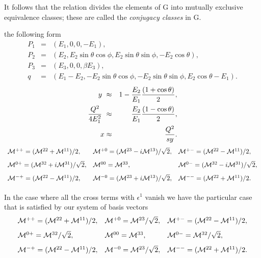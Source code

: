 \documentclass[epsf]{article}
\begin{document}
It follows that the relation divides the elements of G into mutually
exclusive equivalence classes; these are called the {\it conjugacy classes}
in G. 

the following form
  \begin{eqnarray*}
   P_1 & = & (E_1,0,0,-E_1),      \\
   P_2 & = & (E_2,E_2\sin\theta\cos\phi,E_2\sin\theta\sin\phi,
               -E_2\cos\theta),   \\
   P_3 & = & (E_3,0,0,\beta E_3),      \\
   q   & = & (E_1 - E_2,-E_2\sin\theta\cos\phi,-E_2\sin\theta\sin\phi,
                    E_2\cos\theta - E_1).
  \end{eqnarray*}
  \begin{eqnarray*}
    y\     & \approx & 1 - {E_2\over E_1} {(1+\cos\theta)\over2}, \\
    {Q^2\over4E_1^2} \ & \approx & {E_2\over E_1}{(1-\cos\theta)\over2}, \\
    x      & \approx & {Q^2\over sy}.
  \end{eqnarray*}
\[ \begin{array}{lll} 
  {\cal M}^{++}=({\cal M}^{22} + {\cal M}^{11})/2, 
& {\cal M}^{+0}=({\cal M}^{23} -i{\cal M}^{13})/\sqrt{2},
& {\cal M}^{+-}=({\cal M}^{22} - {\cal M}^{11})/2, \\ [8pt]
  {\cal M}^{0+}=({\cal M}^{32} +i{\cal M}^{31})/\sqrt{2}, 
& {\cal M}^{00}= {\cal M}^{33}, 
& {\cal M}^{0-}=({\cal M}^{32} -i{\cal M}^{31})/\sqrt{2}, \\ [8pt]
  {\cal M}^{-+}=({\cal M}^{22} - {\cal M}^{11})/2, 
& {\cal M}^{-0}=({\cal M}^{23} +i{\cal M}^{13})/\sqrt{2}, 
& {\cal M}^{--}=({\cal M}^{22} + {\cal M}^{11})/2. \\ [8pt]
\end{array} \] In the case where all the cross terms with $\epsilon^1$
vanish we have the particular case that is satisfied by our system of 
basis vectors
\[ \begin{array}{lll} 
  {\cal M}^{++}=({\cal M}^{22} + {\cal M}^{11})/2, 
& {\cal M}^{+0}= {\cal M}^{23}/\sqrt{2},
& {\cal M}^{+-}=({\cal M}^{22} - {\cal M}^{11})/2, \\ [8pt]
  {\cal M}^{0+}= {\cal M}^{32}/\sqrt{2}, 
& {\cal M}^{00}= {\cal M}^{33}, 
& {\cal M}^{0-}= {\cal M}^{32}/\sqrt{2}, \\ [8pt]
  {\cal M}^{-+}=({\cal M}^{22} - {\cal M}^{11})/2, 
& {\cal M}^{-0}= {\cal M}^{23}/\sqrt{2}, 
& {\cal M}^{--}=({\cal M}^{22} + {\cal M}^{11})/2. 
\end{array} \]
\end{document}
